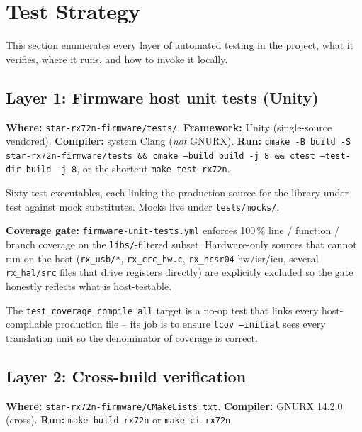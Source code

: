 
\section{Test Strategy}
\label{section:test-strategy}

This section enumerates every layer of automated testing in the
project, what it verifies, where it runs, and how to invoke it
locally.

\subsection{Layer 1: Firmware host unit tests (Unity)}

\textbf{Where:} \texttt{star-rx72n-firmware/tests/}.
\textbf{Framework:} Unity (single-source vendored).
\textbf{Compiler:} system Clang (\emph{not} GNURX).
\textbf{Run:} \texttt{cmake -B build -S star-rx72n-firmware/tests \&\&
cmake --build build -j 8 \&\& ctest --test-dir build -j 8}, or the
shortcut \texttt{make test-rx72n}.

Sixty test executables, each linking the production source for the
library under test against mock substitutes. Mocks live under
\texttt{tests/mocks/}.

\textbf{Coverage gate:} \texttt{firmware-unit-tests.yml} enforces
100\,\% line / function / branch coverage on the
\texttt{libs/}-filtered subset. Hardware-only sources that cannot
run on the host (\texttt{rx\_usb/*}, \texttt{rx\_crc\_hw.c},
\texttt{rx\_hcsr04} hw/isr/icu, several \texttt{rx\_hal/src} files
that drive registers directly) are explicitly excluded so the gate
honestly reflects what is host-testable.

The \texttt{test\_coverage\_compile\_all} target is a no-op test that
links every host-compilable production file -- its job is to ensure
\texttt{lcov --initial} sees every translation unit so the
denominator of coverage is correct.

\subsection{Layer 2: Cross-build verification}

\textbf{Where:} \texttt{star-rx72n-firmware/CMakeLists.txt}.
\textbf{Compiler:} GNURX 14.2.0 (cross).
\textbf{Run:} \texttt{make build-rx72n} or \texttt{make ci-rx72n}.

